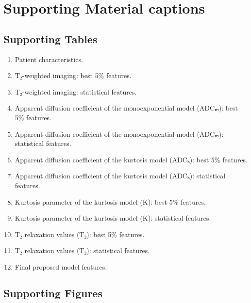 \newcommand{\fig}[2]{\item Patient #1: #2 map, prostate mask, lesion masks.}
\newcommand{\figADCm}[1]{\fig{#1}{ADCₘ}}
\newcommand{\figTtw}[1]{\fig{#1}{T₂w}}
\newcommand{\figTt}[1]{\fig{#1}{T₂}}

\newcommand{\histology}[2]{\item Patient #1: #2.}
\newcommand{\pink}[1]{\histology{#1}{prostatectomy section}}


\section{Supporting Material captions}

\subsection{Supporting Tables}

\begin{enumerate}
\item Patient characteristics.
\item T₂-weighted imaging: best 5\% features.
\item T₂-weighted imaging: statistical features.
\item Apparent diffusion coefficient of the monoexponential model (ADCₘ): best
  5\% features.
\item Apparent diffusion coefficient of the monoexponential model (ADCₘ):
  statistical features.
\item Apparent diffusion coefficient of the kurtosis model (ADCₖ): best 5\%
  features.
\item Apparent diffusion coefficient of the kurtosis model (ADCₖ): statistical
  features.
\item Kurtosis parameter of the kurtosis model (K): best 5\% features.
\item Kurtosis parameter of the kurtosis model (K): statistical features.
\item T₂ relaxation values (T₂): best 5\% features.
\item T₂ relaxation values (T₂): statistical features.
\item Final proposed model features.
\end{enumerate}


\subsection{Supporting Figures}

